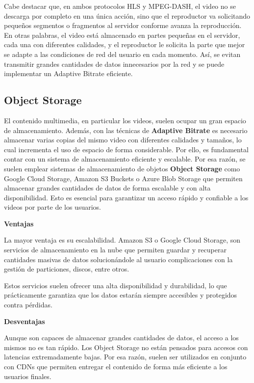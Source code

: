 Cabe destacar que, en ambos protocolos HLS y MPEG-DASH, el video no se descarga por completo en una única acción, sino que el reproductor va solicitando pequeños segmentos o fragmentos al servidor conforme avanza la reproducción. En otras palabras, el video está almacenado en partes pequeñas en el servidor, cada una con diferentes calidades, y el reproductor le solicita la parte que mejor se adapte a las condiciones de red del usuario en cada momento. Así, se evitan transmitir grandes cantidades de datos innecesarios por la red y se puede implementar un Adaptive Bitrate eficiente.

\subsection{Object Storage}
\label{bucket}

El contenido multimedia, en particular los videos, suelen ocupar un gran espacio de almacenamiento. Además, con las técnicas de \textbf{Adaptive Bitrate} es necesario almacenar varias copias del mismo video con diferentes calidades y tamaños, lo cual incrementa el uso de espacio de forma considerable. Por ello, es fundamental contar con un sistema de almacenamiento eficiente y escalable. Por esa razón, se suelen emplear sistemas de almacenamiento de objetos \textbf{Object Storage} \cite{object_storage} como Google Cloud Storage, Amazon S3 Buckets o Azure Blob Storage que permiten almacenar grandes cantidades de datos de forma escalable y con alta disponibilidad. Esto es esencial para garantizar un acceso rápido y confiable a los videos por parte de los usuarios.

\textbf{Ventajas}

La mayor ventaja es su escalabilidad. Amazon S3 o Google Cloud Storage, son servicios de almacenamiento en la nube que permiten guardar y recuperar cantidades masivas de datos solucionándole al usuario complicaciones con la gestión de particiones, discos, entre otros.

Estos servicios suelen ofrecer una alta disponibilidad y durabilidad, lo que prácticamente garantiza que los datos estarán siempre accesibles y protegidos contra pérdidas. 

\textbf{Desventajas}

Aunque son capaces de almacenar grandes cantidades de datos, el acceso a los mismos no es tan rápido. Los Object Storage no están pensados para accesos con latencias extremadamente bajas. Por esa razón, suelen ser utilizados en conjunto con CDNs que permiten entregar el contenido de forma más eficiente a los usuarios finales.

